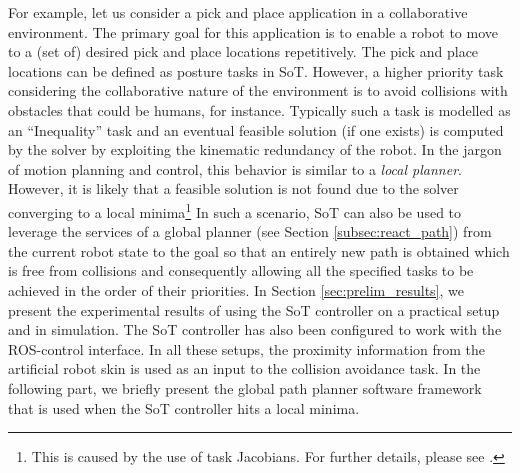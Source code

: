 For example, let us consider a pick and place application in a collaborative
environment. The primary goal for this application is to enable a robot to move
to a (set of) desired pick and place locations repetitively. The pick and place
locations can be defined as posture tasks in SoT. However, a higher priority
task considering the collaborative nature of the environment is to avoid
collisions with obstacles that could be humans, for instance. Typically such a
task is modelled as an ``Inequality'' task and an eventual feasible solution (if
one exists) is computed by the solver by exploiting the kinematic redundancy of the robot. In the jargon of motion planning and control, this behavior is similar to a \emph{local planner}.
However, it is likely that a feasible solution is not found due to the solver
converging to a local minima\footnote{This is caused by the use of task
Jacobians. For further details, please see \cite{Mansard2009}.} In such a
scenario, SoT can also be used to leverage the services of a global planner (see
Section \ref{subsec:react_path}) from the current robot state to the goal so
that an entirely new path is obtained which is free from collisions and
consequently allowing all the specified tasks to be achieved in the order of
their priorities. In Section \ref{sec:prelim_results}, we present the
experimental results of using the SoT controller on a practical setup and in
simulation. The SoT controller has also been configured to work with the ROS-control interface. In all these setups, the proximity information from
the artificial robot skin is used as an input to the collision avoidance task. In
the following part, we briefly present the global path planner software framework
that is used when the SoT controller hits a local minima.
